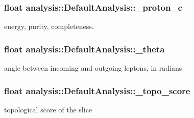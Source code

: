 \subsubsection[{\texorpdfstring{\+\_\+proton\+\_\+c}{_proton_c}}]{\setlength{\rightskip}{0pt plus 5cm}float analysis\+::\+Default\+Analysis\+::\+\_\+proton\+\_\+c\hspace{0.3cm}{\ttfamily [private]}}\hypertarget{classanalysis_1_1DefaultAnalysis_a643cc086bdfa4332ced72f6d4e5ce233}{}\label{classanalysis_1_1DefaultAnalysis_a643cc086bdfa4332ced72f6d4e5ce233}
energy, purity, completeness. 
\subsubsection[{\texorpdfstring{\+\_\+theta}{_theta}}]{\setlength{\rightskip}{0pt plus 5cm}float analysis\+::\+Default\+Analysis\+::\+\_\+theta\hspace{0.3cm}{\ttfamily [private]}}\hypertarget{classanalysis_1_1DefaultAnalysis_adb169ccacccada1a17b6699a25f3fd67}{}\label{classanalysis_1_1DefaultAnalysis_adb169ccacccada1a17b6699a25f3fd67}
angle between incoming and outgoing leptons, in radians 
\subsubsection[{\texorpdfstring{\+\_\+topo\+\_\+score}{_topo_score}}]{\setlength{\rightskip}{0pt plus 5cm}float analysis\+::\+Default\+Analysis\+::\+\_\+topo\+\_\+score\hspace{0.3cm}{\ttfamily [private]}}\hypertarget{classanalysis_1_1DefaultAnalysis_a950efb6f4e8f1ad6dd00e24bc74002c2}{}\label{classanalysis_1_1DefaultAnalysis_a950efb6f4e8f1ad6dd00e24bc74002c2}
topological score of the slice 
